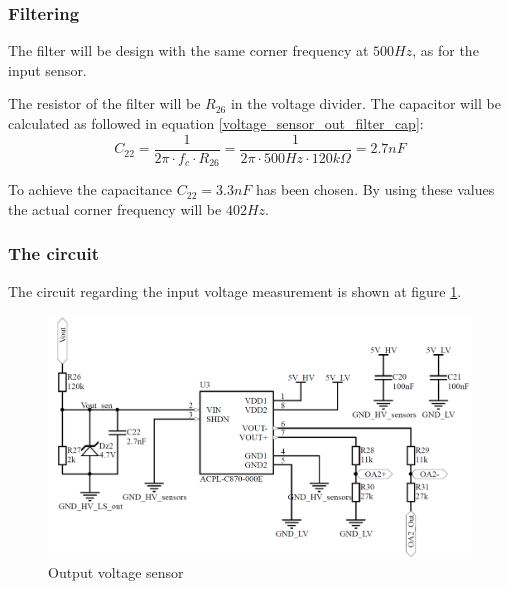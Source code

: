 \subsubsection{Filtering}
The filter will be design with the same corner frequency at $500Hz$, as for the input sensor.

The resistor of the filter will be $R_{26}$ in the voltage divider. The capacitor will be calculated as followed in equation \ref{voltage_sensor_out_filter_cap}:
\begin{equation} \label{voltage_sensor_out_filter_cap}
	C_{22} = \frac{1}{2\pi \cdot f_c \cdot R_{26}} = \frac{1}{2 \pi \cdot 500Hz \cdot 120k\Omega} = 2.7nF
\end{equation}

To achieve the capacitance $C_{22} = 3.3nF$ has been chosen. By using these values the actual corner frequency will be $402 Hz$.

\subsubsection{The circuit}
The circuit regarding the input voltage measurement is shown at figure \ref{fig:output_voltage_sensor_circuit}. 

\begin{figure}[H]
	\begin{center}
		\includegraphics[width=0.7\linewidth]{../Pictures/P1/Sensors/output_voltage_sensor.PNG}
		\caption{Output voltage sensor}
		\label{fig:output_voltage_sensor_circuit}
	\end{center}
\end{figure}